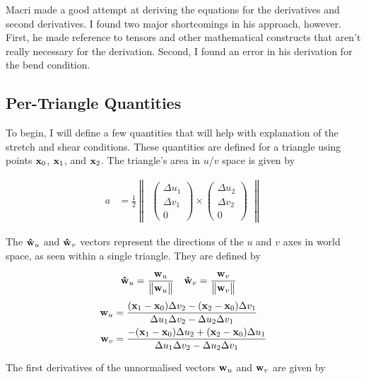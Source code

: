 \documentclass[twocolumn]{article}
\newcommand{\norm}[1]{\begin{Vmatrix}#1\end{Vmatrix}}
\newcommand{\cross}{\times}
\newcommand{\x}{{\bf x}}
\newcommand{\du}{\Delta u}
\newcommand{\dv}{\Delta v}
\newcommand{\w}{{\bf w}}
\newcommand{\what}{{\bf {\hat w}}}
\newcommand{\wu}{\w_u}
\newcommand{\whatu}{\what_u}
\newcommand{\wv}{\w_v}
\newcommand{\whatv}{\what_v}
\begin{document}
Macri made a good attempt at deriving the equations for the derivatives
and second derivatives. I found two major shortcomings in his approach, however.
First, he made reference to tensors and other mathematical constructs that
aren't really necessary for the derivation. Second, I found an error in his
derivation for the bend condition.

\subsection{Per-Triangle Quantities}

To begin, I will define a few quantities that will help with explanation of
the stretch and shear conditions. These quantities are defined for a triangle
using points $\x_0$, $\x_1$, and $\x_2$. The triangle's area in $u$/$v$ space
is given by

\begin{align}
a &= \frac{1}{2} \norm{
       \begin{pmatrix} \du_1 \\ \dv_1 \\ 0 \end{pmatrix} \cross
       \begin{pmatrix} \du_2 \\ \dv_2 \\ 0 \end{pmatrix} }
\end{align}

The $\whatu$ and $\whatv$ vectors represent the directions of the $u$ and $v$
axes in world space, as seen within a single triangle. They are defined by

\begin{align}
\whatu &= \frac{ \wu }{\norm {\wu}} &
%
\whatv &= \frac{ \wv }{\norm {\wv}}
\end{align}
\begin{align}
\wu &= \frac{ (\x_1 - \x_0) \dv_2 - (\x_2 - \x_0) \dv_1}
    {\du_1 \dv_2 - \du_2 \dv_1} \\
%
\wv &= \frac{ -(\x_1 - \x_0) \du_2 + (\x_2 - \x_0) \du_1}
   {\du_1 \dv_2 - \du_2 \dv_1}
\end{align}

The first derivatives of the unnormalised vectors $\wu$ and $\wv$ are
given by
\end{document}
